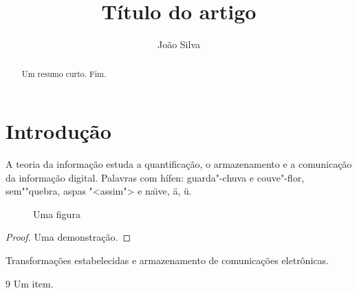 \documentclass{article}
\title{Título do artigo}
\author{João Silva}
\begin{document}
\maketitle
\begin{abstract}
Um resumo curto. Fim.
\end{abstract}
\tableofcontents
\section{Introdução}
A teoria da informação estuda a quantificação, o armazenamento e a comunicação da informação digital.
Palavras com hífen: guarda"-chuva e couve"-flor, sem""quebra, aspas "<assim"> e na\"{\i}ve, \"a, ü.
\begin{figure}[h]
\caption{Uma figura}
\end{figure}
\begin{table}[h]
\caption{Uma tabela}
\end{table}
\begin{proof}
Uma demonstração.
\end{proof}
\begin{minipage}{60pt}
Transformações estabelecidas e armazenamento de comunicações eletrônicas.
\end{minipage}
\begin{thebibliography}{9}
 Um item.
\end{thebibliography}
\end{document}
